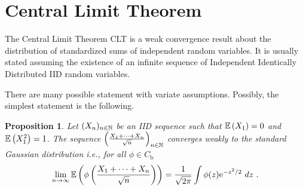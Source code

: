 \documentclass[12pt,a4paper]{amsart}
\theoremstyle{plain}%
\newtheorem{proposition}[thm]{Proposition}
\theoremstyle{definition}
\theoremstyle{remark}
\begin{document}
\section{Central Limit Theorem}
\label{sec:centr-limit-theor}

The Central Limit Theorem CLT is a weak convergence result about the distribution of standardized sums of independent random variables. It is usually stated assuming the existence of an infinite sequence of Independent Identically Distributed IID random variables.

There are many possible statement with variate assumptions. Possibly,
the simplest statement is the following.
\begin{proposition}Let $(X_n)_{n \in \mathbb{N}}$ be an IID sequence such that $\operatorname{\mathbb E}\left(X_1\right) = 0$ and $\operatorname{\mathbb E}\left(X_1^2\right) = 1$. The sequence $\left(\frac{X_1+\cdots+X_n}{\sqrt n}\right)_{n\in\mathbb{N}}$ converges weakly to the standard Gaussian distribution i.e., for all $\phi \in C_{\text{b}}$
  \begin{equation*}
    \lim_{n \to \infty} \operatorname{\mathbb E}\left(\phi\left(\frac{X_1+\cdots+X_n}{\sqrt n}\right)\right) = \frac1{\sqrt{2\pi}} \int \phi(z) \mathrm{e}^{- z^2/2} \ dz \ .
  \end{equation*}
\end{proposition}
\end{document}
